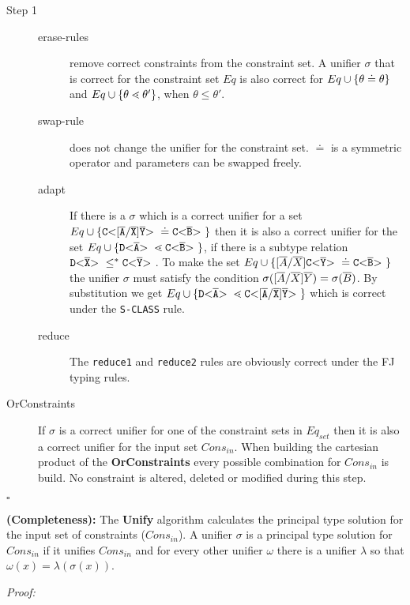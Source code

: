 \documentclass[acmsmall,screen,review]{acmart}
\begin{document}
\begin{description}
\item[Step 1]
\begin{description}
\item[erase-rules] remove correct constraints from the constraint set.
A unifier $\sigma$ that is correct for the constraint set $Eq$
is also correct for $Eq \cup \{ \theta \doteq \theta \}$
and $Eq \cup \{ \theta \lessdot \theta' \}$, when $\theta \leq \theta'$.
\item[swap-rule] does not change the unifier for the constraint set.
$\doteq$ is a symmetric operator and parameters can be swapped freely.
\item[adapt] If there is a $\sigma$ which is a correct unifier for a set
$Eq \cup \{  \mathtt{C {\tt <} [\overline{A}/\overline{X}]\overline{Y} {\tt >} \ } \doteq \mathtt{C {\tt <} \overline{B} {\tt >} \ } \}$ then it is also
a correct unifier for the set $Eq \cup \{  \mathtt{D {\tt <} \overline{A} {\tt >} \ } \lessdot \mathtt{C {\tt <} \overline{B} {\tt >} \ } \}$,
if there is a subtype relation $\mathtt{D {\tt <} \overline{X} {\tt >} \ } \leq^* \mathtt{C {\tt <} \overline{Y} {\tt >} \ }$.
To make the set $Eq \cup \{  [\overline{A}/\overline{X}]\mathtt{C {\tt <} \overline{Y} {\tt >} \ } \doteq \mathtt{C {\tt <} \overline{B} {\tt >} \ } \}$ the unifier 
$\sigma$ must satisfy the condition $\sigma([\overline{A}/\overline{X}]\overline{Y}) = \sigma(\overline{B})$.
By substitution we get $Eq \cup \{  \mathtt{D {\tt <} \overline{A} {\tt >} \ } \lessdot \mathtt{C {\tt <} [\overline{A}/\overline{X}]\overline{Y} {\tt >} \ } \}$
which is correct under the \texttt{S-CLASS} rule.
\item[reduce] The \texttt{reduce1} and \texttt{reduce2} rules are obviously correct under the FJ typing rules.
\end{description}

\item[OrConstraints]
If $\sigma$ is a correct unifier for one of the constraint sets in $Eq_{set}$
then it is also a correct unifier for the input set $Cons_{in}$.
When building the cartesian product of the \textbf{OrConstraints} every possible
combination for $Cons_{in}$ is build.
No constraint is altered, deleted or modified during this step.
\end{description}
\hfill $\square$


\begin{theoremAndi}\label{theo:unifyCompleteness}
  \textbf{(Completeness):} The \textbf{Unify} algorithm calculates the principal type solution for the input set of constraints ($Cons_{in}$).
  A unifier $\sigma$ is a principal type solution for $Cons_{in}$ if it unifies $Cons_{in}$
  and for every other unifier $\omega$ there is a unifier $\lambda$ so that $\omega(x) = \lambda(\sigma(x))$.
\end{theoremAndi}
\textit{Proof:}
\end{document}
